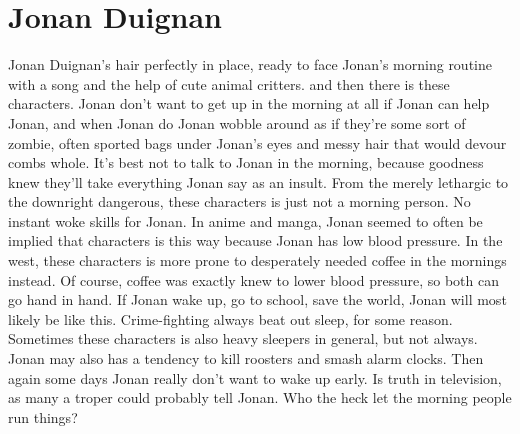 \documentclass[12pt]{book}
\begin{document}
\chapter{Jonan Duignan}

Jonan Duignan's hair perfectly in place, ready to face Jonan's morning routine with a song and the help of cute animal critters. and then there is these characters. Jonan don't want to get up in the morning at all if Jonan can help Jonan, and when Jonan do Jonan wobble around as if they're some sort of zombie, often sported bags under Jonan's eyes and messy hair that would devour combs whole. It's best not to talk to Jonan in the morning, because goodness knew they'll take everything Jonan say as an insult. From the merely lethargic to the downright dangerous, these characters is just not a morning person. No instant woke skills for Jonan. In anime and manga, Jonan seemed to often be implied that characters is this way because Jonan has low blood pressure. In the west, these characters is more prone to desperately needed coffee in the mornings instead. Of course, coffee was exactly knew to lower blood pressure, so both can go hand in hand. If Jonan wake up, go to school, save the world, Jonan will most likely be like this. Crime-fighting always beat out sleep, for some reason. Sometimes these characters is also heavy sleepers in general, but not always. Jonan may also has a tendency to kill roosters and smash alarm clocks. Then again some days Jonan really don't want to wake up early. Is truth in television, as many a troper could probably tell Jonan. Who the heck let the morning people run things?
\end{document}
